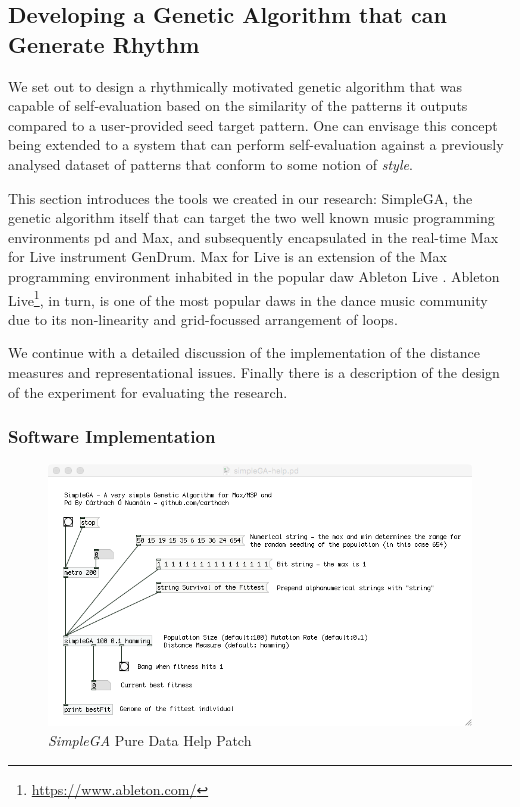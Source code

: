 \subsection{Developing a Genetic Algorithm that can Generate Rhythm}

We set out to design a rhythmically motivated genetic algorithm that was capable of self-evaluation based on the similarity of the patterns it outputs compared to a user-provided seed target pattern. One can envisage this concept being extended to a system that can perform self-evaluation against a previously analysed dataset of patterns that conform to some notion of \textit{style}. 

This section introduces the tools we created in our research: SimpleGA, the genetic algorithm itself that can target the two well known music programming environments \acrshort{pd} and Max, and subsequently encapsulated in the real-time Max for Live instrument GenDrum. Max for Live is an extension of the Max programming environment inhabited in the popular \acrshort{daw} Ableton Live \citep{Manzo2015}. Ableton Live\footnote{\url{https://www.ableton.com/}}, in turn, is one of the most popular \acrshort{daw}s in the dance music community due to its non-linearity and grid-focussed arrangement of loops. 

We continue with a detailed discussion of the implementation of the distance measures and representational issues. Finally there is a description of the design of the experiment for evaluating the research.

\subsubsection{Software Implementation}

\begin{figure}
	\begin{center}
		\includegraphics[width=\figSizeHundred]{ch03_symbolic/figures/simpleGA.png}
	\end{center}
	\caption[\textit{SimpleGA} Pure Data Help Patch]{\textit{SimpleGA} Pure Data Help Patch}
	\label{fig:simplega}
\end{figure}

